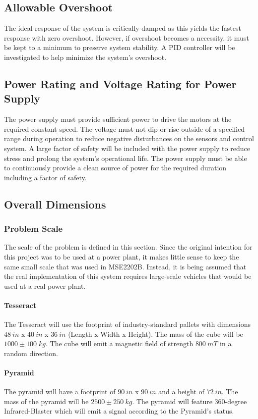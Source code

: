 \documentclass[12pt]{article}
\begin{document}
\subsection{Allowable Overshoot}
The ideal response of the system is critically-damped as this yields the fastest response with zero overshoot. However, if overshoot becomes a necessity, it must be kept to a minimum to preserve system stability. A PID controller will be investigated to help minimize the system's overshoot.
\subsection{Power Rating and Voltage Rating for Power Supply}
The power supply must provide sufficient power to drive the motors at the required constant speed. The voltage must not dip or rise outside of a specified range during operation to reduce negative disturbances on the sensors and control system. A large factor of safety will be included with the power supply to reduce stress and prolong the system's operational life. The power supply must be able to continuously provide a clean source of power for the required duration including a factor of safety.
\subsection{Overall Dimensions}

\subsubsection{Problem Scale}
The scale of the problem is defined in this section. Since the original intention for this project was to be used at a power plant, it makes little sense to keep the same small scale that was used in MSE2202B. Instead, it is being assumed that the real implementation of this system requires large-scale vehicles that would be used at a real power plant. 

\paragraph{Tesseract} The Tesseract will use the footprint of industry-standard pallets with dimensions $48 \: in$ x $40 \: in$ x $36 \: in$ (Length x Width x Height). The mass of the cube will be $1000 \pm 100 \; kg$. The cube will emit a magnetic field of strength $800 \: mT$ in a random direction.

\paragraph{Pyramid} The pyramid will have a footprint of $90 \: in$ x $90 \: in$ and a height of $72 \: in$. The mass of the pyramid will be $2500 \pm 250 \: kg$. The pyramid will feature 360-degree Infrared-Blaster which will emit a signal according to the Pyramid's status.
\end{document}

